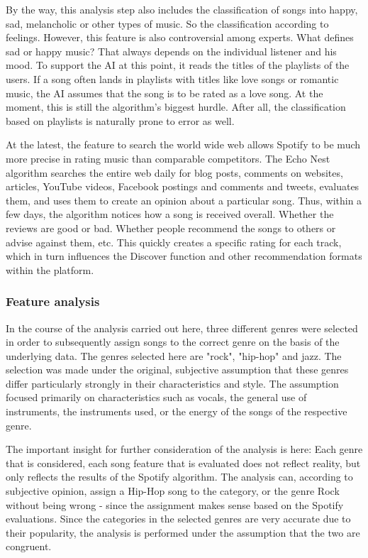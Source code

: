 By the way, this analysis step also includes the classification of songs into happy, sad, melancholic or other types of music. 
So the classification according to feelings. However, this feature is also controversial among experts. What defines sad or happy music? 
That always depends on the individual listener and his mood. To support the AI at this point, it reads the titles of the playlists of the users. 
If a song often lands in playlists with titles like love songs or romantic music, the AI assumes that the song is to be rated as a love song. 
At the moment, this is still the algorithm's biggest hurdle. After all, the classification based on playlists is naturally prone to error as well.  

At the latest, the feature to search the world wide web allows Spotify to be much more precise in rating music than comparable competitors. 
The Echo Nest algorithm searches the entire web daily for blog posts, comments on websites, articles, YouTube videos, Facebook postings and comments and tweets, 
evaluates them, and uses them to create an opinion about a particular song. Thus, within a few days, the algorithm notices how a song is received overall. 
Whether the reviews are good or bad. Whether people recommend the songs to others or advise against them, etc. 
This quickly creates a specific rating for each track, which in turn influences the Discover function and other recommendation formats within the platform. 

\subsubsection{Feature analysis}
In the course of the analysis carried out here, three different genres were selected in order to subsequently assign songs to the correct genre on the basis of the underlying data. 
The genres selected here are "rock", "hip-hop" and jazz. The selection was made under the original, 
subjective assumption that these genres differ particularly strongly in their characteristics and style. 
The assumption focused primarily on characteristics such as vocals, the general use of instruments, the instruments used, or the energy of the songs of the respective genre.

The important insight for further consideration of the analysis is here: Each genre that is considered, each song feature that is evaluated does not reflect reality, 
but only reflects the results of the Spotify algorithm. The analysis can, according to subjective opinion, assign a Hip-Hop song to the category, 
or the genre Rock without being wrong - since the assignment makes sense based on the Spotify evaluations. 
Since the categories in the selected genres are very accurate due to their popularity, the analysis is performed under the assumption that the two are congruent. 

